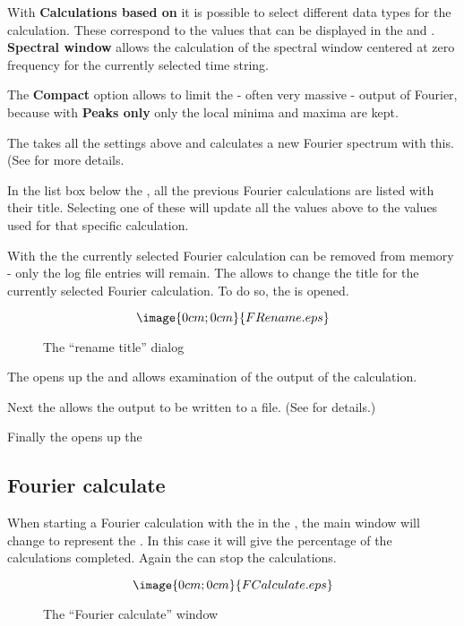 With {\bf Calculations based on} it is possible to select different data types
for the calculation. These correspond to the values that can be displayed in
the  and
%
. {\bf Spectral window }allows the calculation of the spectral window centered
at zero frequency for the currently selected time string.

The {\bf Compact} option allows to limit the - often very massive - output 
of Fourier, because with {\bf Peaks only} only the local minima and maxima
are kept.

The  takes all the settings above and 
calculates a new Fourier spectrum with this. (See
for more details.

In the list box below the , all the previous
Fourier calculations are listed with their title. Selecting one of these will
update all the values above to the values used for that specific
calculation.

With the  the currently selected Fourier calculation
can be removed from memory - only the log file entries will remain.
The  allows to change the title for the currently
selected Fourier calculation. To do so, the
 is opened.
\begin{figure}[h]
$$\image{0cm;0cm}{FRename.eps}$$%
\caption{The ``rename title'' dialog}%
\label{fourier.rename.dialog}
\end{figure}

The  opens up the 
and allows examination of the output of the calculation.

Next the  allows the output to be written to a file.
(See  for details.)

Finally the  opens up the

\subsection{Fourier calculate}%
\label{fourier.calculate}
When starting a Fourier calculation with the  in
the %
, the main window will change
to represent the 
%
. In this case it will give the percentage of the calculations completed.
Again the  can stop the calculations.
\begin{figure}[h]
$$\image{0cm;0cm}{FCalculate.eps}$$%
\caption{The ``Fourier calculate'' window}%
\label{fourier.calculate.dialog}
\end{figure}

